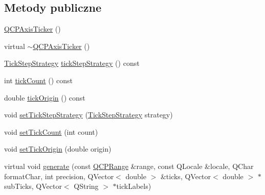 \subsection*{Metody publiczne}
\begin{DoxyCompactItemize}
\item 
\hyperlink{class_q_c_p_axis_ticker_a8fcf23c79ebd72202fe79253f9f01ea8}{Q\+C\+P\+Axis\+Ticker} ()
\item 
virtual \hyperlink{class_q_c_p_axis_ticker_a1119d6f09ad720f9c5dfdd2559047161}{$\sim$\+Q\+C\+P\+Axis\+Ticker} ()
\item 
\hyperlink{class_q_c_p_axis_ticker_ab6d2f9d9477821623ac9bc4b21ddf49a}{Tick\+Step\+Strategy} \hyperlink{class_q_c_p_axis_ticker_adbde618e69fee8215e90aab20eb7fe88}{tick\+Step\+Strategy} () const 
\item 
int \hyperlink{class_q_c_p_axis_ticker_a860d9fbe9762abd19560b27b2b803f14}{tick\+Count} () const 
\item 
double \hyperlink{class_q_c_p_axis_ticker_a521d8e0d3dc5b711bad3582c1473d333}{tick\+Origin} () const 
\item 
void \hyperlink{class_q_c_p_axis_ticker_a73b1d847c1a12159af6bfda4ebebe7d5}{set\+Tick\+Step\+Strategy} (\hyperlink{class_q_c_p_axis_ticker_ab6d2f9d9477821623ac9bc4b21ddf49a}{Tick\+Step\+Strategy} strategy)
\item 
void \hyperlink{class_q_c_p_axis_ticker_a47752abba8293e6dc18491501ae34008}{set\+Tick\+Count} (int count)
\item 
void \hyperlink{class_q_c_p_axis_ticker_ab509c7e500293bf66a8409f0d7c23943}{set\+Tick\+Origin} (double origin)
\item 
virtual void \hyperlink{class_q_c_p_axis_ticker_aefbd11725678ca824add8cf926cbc856}{generate} (const \hyperlink{class_q_c_p_range}{Q\+C\+P\+Range} \&range, const Q\+Locale \&locale, Q\+Char format\+Char, int precision, Q\+Vector$<$ double $>$ \&ticks, Q\+Vector$<$ double $>$ $\ast$sub\+Ticks, Q\+Vector$<$ Q\+String $>$ $\ast$tick\+Labels)
\end{DoxyCompactItemize}
